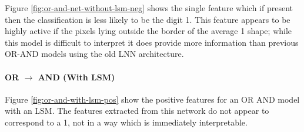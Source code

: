 \noindent
\begin{minipage}[t]{0.5\textwidth}
	\vspace{0cm}
Figure \ref{fig:or-and-net-without-lsm-neg} shows the single feature which if present then the classification is less likely to be the digit 1. This feature appears to be highly active if the pixels lying outside the border of the average 1 shape; while this model is difficult to interpret it does provide more information than previous OR-AND models using the old LNN architecture.
		
\paragraph{OR $\rightarrow$ AND (With LSM)} Figure \ref{fig:or-and-with-lsm-pos} show the positive features for an OR AND model with an LSM. 
The features extracted from this network do not appear to correspond to a 1, not in a way which is immediately interpretable. 
\end{minipage}
\hspace{0.05\textwidth}
